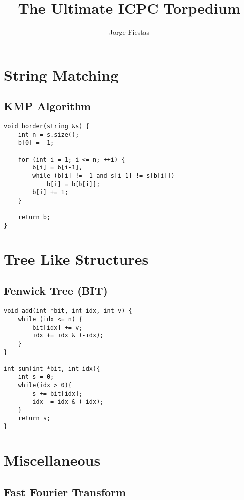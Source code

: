 \documentclass{article}
\title{The Ultimate ICPC Torpedium}
\author{Jorge Fiestas}
\begin{document}
\maketitle

\section{String Matching}

\subsection{KMP Algorithm}

\begin{lstlisting}
void border(string &s) {
	int n = s.size();
	b[0] = -1;

	for (int i = 1; i <= n; ++i) {
		b[i] = b[i-1];
		while (b[i] != -1 and s[i-1] != s[b[i]])
			b[i] = b[b[i]];
		b[i] += 1;
	}

	return b;
}
\end{lstlisting}

\section{Tree Like Structures}

\subsection{Fenwick Tree (BIT)}

\begin{lstlisting}
void add(int *bit, int idx, int v) {
    while (idx <= n) {
        bit[idx] += v;
        idx += idx & (-idx);
    }
}

int sum(int *bit, int idx){
    int s = 0;
    while(idx > 0){
        s += bit[idx];
        idx -= idx & (-idx);
    }
    return s;
}
\end{lstlisting}

\section{Miscellaneous}

\subsection{Fast Fourier Transform}
\end{document}
